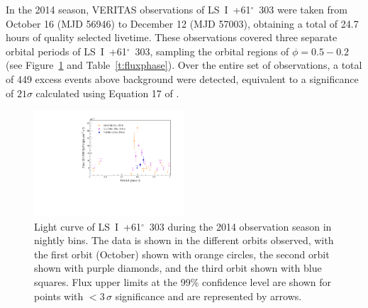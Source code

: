 \documentclass[preprint2]{aastex}
\newcommand{\lsi}{LS~I~+61$^{\circ}$~303}
\begin{document}
In the 2014 season, VERITAS observations of \lsi{} were taken from October 16 (MJD 56946) to  December 12 (MJD 57003), obtaining a total of 24.7 hours of quality selected livetime. These observations covered three separate orbital periods of \lsi{}, sampling the orbital regions of $\phi = 0.5-0.2$ (see Figure~\ref{f:fluxphase} and Table~\ref{t:fluxphase}). Over the entire set of observations, a total of 449 excess events above background were detected, equivalent to a significance of $21\sigma$ calculated using Equation 17 of \citet{LiMa}.

\begin{figure}[ht]
\centering
\includegraphics[width=0.5\textwidth]{./figs/fluxvphase_300.pdf}
\caption{Light curve of \lsi{} during the 2014 observation season in nightly bins. %
The data is shown in the different orbits observed, with the first orbit (October) shown with orange circles, the second orbit shown with purple diamonds, and the third orbit shown with blue squares. Flux upper limits at the 99\% confidence level are shown for points with $<3\,\sigma$ significance and are represented by arrows.
}
\label{f:fluxphase}
\end{figure}
\end{document}
